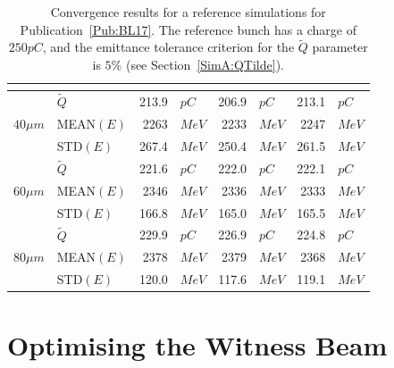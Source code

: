 \begin{table}[hbt]
    \centering
    \caption{Convergence results for a reference simulations for Publication~\ref{Pub:BL17}.
    The reference bunch has a charge of $250\unit{pC}$, and the emittance tolerance criterion for the $\tilde{Q}$ parameter is $5\%$ (see Section~\ref{SimA:QTilde}).}
    \label{T:Converg}
    \begin{tabularx}{132mm}{Xl d{1}l d{1}l d{1}l}
         & 
            & 
            & 
            &  \\
        \hline
                         & $\tilde{Q}$ &  213.9 & $\unit{pC}$  &  206.9 & $\unit{pC}$  &  213.1 & $\unit{pC}$  \\
        $40\unit{\mu m}$ & MEAN$(E)$   & 2263   & $\unit{MeV}$ & 2233   & $\unit{MeV}$ & 2247   & $\unit{MeV}$ \\
                         & STD$(E)$    &  267.4 & $\unit{MeV}$ &  250.4 & $\unit{MeV}$ &  261.5 & $\unit{MeV}$ \\
        \hline
                         & $\tilde{Q}$ &  221.6 & $\unit{pC}$  &  222.0 & $\unit{pC}$  &  222.1 & $\unit{pC}$  \\
        $60\unit{\mu m}$ & MEAN$(E)$   & 2346   & $\unit{MeV}$ & 2336   & $\unit{MeV}$ & 2333   & $\unit{MeV}$ \\
                         & STD$(E)$    &  166.8 & $\unit{MeV}$ &  165.0 & $\unit{MeV}$ &  165.5 & $\unit{MeV}$ \\
        \hline
                         & $\tilde{Q}$ &  229.9 & $\unit{pC}$  &  226.9 & $\unit{pC}$  &  224.8 & $\unit{pC}$  \\
        $80\unit{\mu m}$ & MEAN$(E)$   & 2378   & $\unit{MeV}$ & 2379   & $\unit{MeV}$ & 2368   & $\unit{MeV}$ \\
                         & STD$(E)$    &  120.0 & $\unit{MeV}$ &  117.6 & $\unit{MeV}$ &  119.1 & $\unit{MeV}$ \\
    \end{tabularx}
\end{table}

\section{Optimising the Witness Beam}
\label{SimA:Opt}

